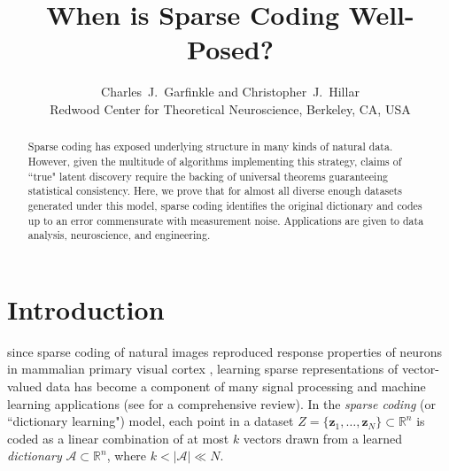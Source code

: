 \documentclass[journal, twocolumn]{IEEEtran}
\begin{document}
\title{When is Sparse Coding Well-Posed?}

\author{Charles~J.~Garfinkle and Christopher~J.~Hillar \\
Redwood Center for Theoretical Neuroscience, Berkeley, CA, USA
}
\maketitle

\begin{abstract}
Sparse coding has exposed underlying structure in many kinds of natural data.  However, given the multitude of algorithms implementing this strategy, claims of ``true" latent discovery require the backing of universal theorems guaranteeing statistical consistency.  Here, we prove that for almost all diverse enough datasets generated under this model, sparse coding identifies the original dictionary and codes up to an error commensurate with measurement noise. Applications are given to data analysis, neuroscience, and engineering.
\end{abstract}



\section{Introduction}\label{Intro}
 since sparse coding of natural images reproduced response properties of neurons in mammalian primary visual cortex \cite{Olshausen96, hurri1996image, bell1997independent, van1998independent}, learning sparse representations of vector-valued data has become a component of many signal processing and machine learning applications (see \cite{Zhang15} for a comprehensive review). In the \textit{sparse coding} (or ``dictionary learning") model, each point in a dataset $Z = \{\mathbf{z}_1, \ldots, \mathbf{z}_N\} \subset \mathbb{R}^n$ is coded as a linear combination of at most $k$ vectors drawn from a learned \emph{dictionary} $\mathcal{A} \subset \mathbb{R}^n$, where $k < |\mathcal{A}| \ll N$. 
\end{document}
